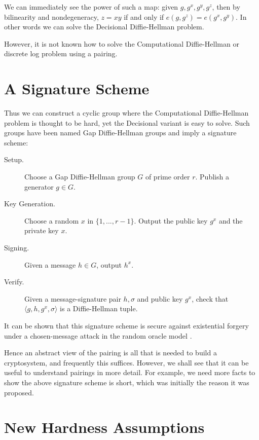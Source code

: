 We can immediately see the power of such a map: given
$g, g^x, g^y, g^z$, then by bilinearity and nondegeneracy,
$z = x y$ if and only if
$e(g, g^z) = e(g^x, g^y)$. In other words we can solve the Decisional
Diffie-Hellman problem.

However, it is not known how to solve the Computational Diffie-Hellman
or discrete log problem using a pairing.

\section{A Signature Scheme}

Thus we can construct a cyclic group where the Computational Diffie-Hellman
problem is thought to be hard, yet the Decisional variant is easy to solve.
Such groups have been named Gap Diffie-Hellman groups\cite{bls} and
imply a signature scheme:

\begin{description}
\item[Setup.]
Choose a Gap Diffie-Hellman group $G$ of prime order $r$.
Publish a generator $g \in G$.

\item[Key Generation.]
Choose a random $x$ in $\{1,...,r-1\}$. Output
the public key $g^x$ and the private key $x$.

\item[Signing.]
Given a message $h \in G$, output $h^x$.

\item[Verify.]
Given a message-signature pair $h, \sigma$ and public key $g^x$,
check that $\langle{ g, h, g^x, \sigma}\rangle$ is a Diffie-Hellman tuple.
\end{description}

It can be shown that this signature scheme is secure against existential
forgery under a chosen-message attack in the random oracle model \cite{bls}.

Hence an abstract view of the pairing is all that is needed to build a
cryptosystem, and frequently this suffices. However,
we shall see that it can be useful to understand pairings in more detail.
For example, we need more facts to show the above signature scheme is
short, which was initially the reason it was proposed.

\section{New Hardness Assumptions}

